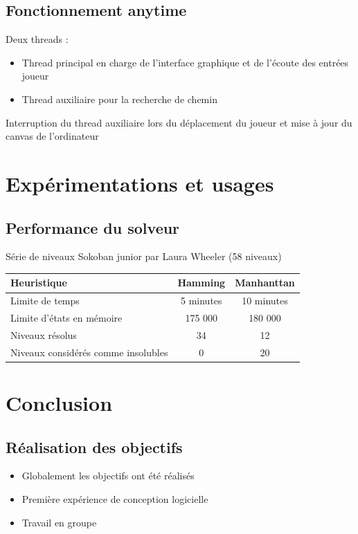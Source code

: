 \documentclass{beamer}
\begin{document}
\subsection{Fonctionnement anytime}
\begin{frame}
Deux threads :
\begin{itemize}
\item Thread principal en charge de l'interface graphique et de l'écoute des entrées joueur
\item Thread auxiliaire pour la recherche de chemin
\end{itemize}
Interruption du thread auxiliaire lors du déplacement du joueur et mise à jour du canvas de l'ordinateur
\end{frame}

\section{Expérimentations et usages}
\subsection{Performance du solveur}
\begin{frame}
  Série de niveaux Sokoban junior par Laura Wheeler (58 niveaux)
  \centering
  \begin{tabular}{|l|c|c|}
  \hline
  Heuristique                          & Hamming   & Manhanttan \\
  \hline
  Limite de temps                      & 5 minutes & 10 minutes \\
  \hline
  Limite d'états en mémoire            & 175 000   & 180 000    \\
  \hline
  Niveaux résolus                      &    34     &    12      \\
  \hline
  Niveaux considérés comme insolubles  &    0      &    20      \\
  \hline  
  \end{tabular}
\end{frame}

\section{Conclusion}
\subsection{Réalisation des objectifs}
\begin{frame}
\begin{itemize}
\item Globalement les objectifs ont été réalisés
\item Première expérience de conception logicielle
\item Travail en groupe
\end{itemize}
\end{frame}
\end{document}

